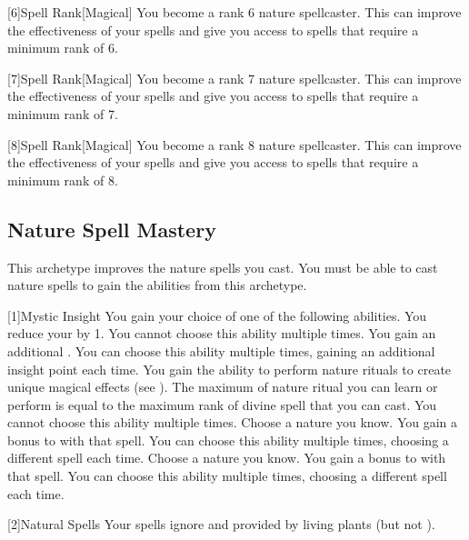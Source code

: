         [6]{Spell Rank}[Magical] You become a rank 6 nature spellcaster.
        This can improve the effectiveness of your spells and give you access to spells that require a minimum rank of 6.

        [7]{Spell Rank}[Magical] You become a rank 7 nature spellcaster.
        This can improve the effectiveness of your spells and give you access to spells that require a minimum rank of 7.

        [8]{Spell Rank}[Magical] You become a rank 8 nature spellcaster.
        This can improve the effectiveness of your spells and give you access to spells that require a minimum rank of 8.

    \subsection{Nature Spell Mastery}
        This archetype improves the nature spells you cast.
        You must be able to cast nature spells to gain the abilities from this archetype.

        [1]{Mystic Insight}
        You gain your choice of one of the following abilities.
        {
             You reduce your  by 1.
                You cannot choose this ability multiple times.
             You gain an additional .
                You can choose this ability multiple times, gaining an additional insight point each time.
             You gain the ability to perform nature rituals to create unique magical effects (see ).
                The maximum  of nature ritual you can learn or perform is equal to the maximum rank of divine spell that you can cast.
                You cannot choose this ability multiple times.
             Choose a nature  you know.
                You gain a  bonus to  with that spell.
                You can choose this ability multiple times, choosing a different spell each time.
             Choose a nature  you know.
                You gain a  bonus to  with that spell.
                You can choose this ability multiple times, choosing a different spell each time.
        }

        [2]{Natural Spells} Your spells ignore  and  provided by living plants (but not ).

